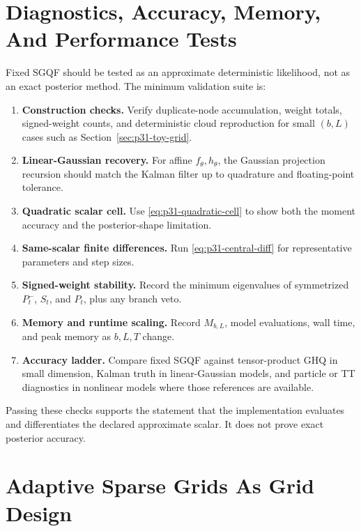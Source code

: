 \documentclass[11pt]{article}
\numberwithin{equation}{section}
\begin{document}
\section{Diagnostics, Accuracy, Memory, And Performance Tests}
\label{sec:p31-validation}

Fixed SGQF should be tested as an approximate deterministic likelihood, not as
an exact posterior method.  The minimum validation suite is:

\begin{enumerate}[leftmargin=0.24in]
\item \textbf{Construction checks.}  Verify duplicate-node accumulation,
weight totals, signed-weight counts, and deterministic cloud reproduction for
small \((b,L)\) cases such as Section~\ref{sec:p31-toy-grid}.
\item \textbf{Linear-Gaussian recovery.}  For affine \(f_\theta,h_\theta\),
the Gaussian projection recursion should match the Kalman filter up to
quadrature and floating-point tolerance.
\item \textbf{Quadratic scalar cell.}  Use \eqref{eq:p31-quadratic-cell} to
show both the moment accuracy and the posterior-shape limitation.
\item \textbf{Same-scalar finite differences.}  Run
\eqref{eq:p31-central-diff} for representative parameters and step sizes.
\item \textbf{Signed-weight stability.}  Record the minimum eigenvalues of
symmetrized \(P_t^-\), \(S_t\), and \(P_t\), plus any branch veto.
\item \textbf{Memory and runtime scaling.}  Record \(M_{b,L}\), model
evaluations, wall time, and peak memory as \(b,L,T\) change.
\item \textbf{Accuracy ladder.}  Compare fixed SGQF against tensor-product GHQ
in small dimension, Kalman truth in linear-Gaussian models, and particle or TT
diagnostics in nonlinear models where those references are available.
\end{enumerate}

Passing these checks supports the statement that the implementation evaluates
and differentiates the declared approximate scalar.  It does not prove exact
posterior accuracy.

\section{Adaptive Sparse Grids As Grid Design}
\label{sec:p31-adaptive}
\end{document}
